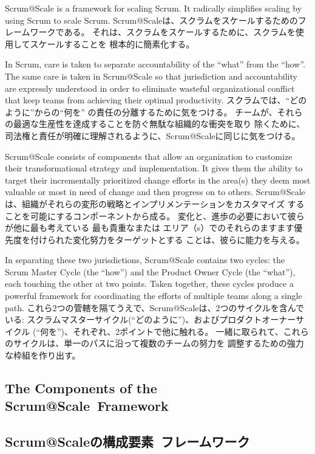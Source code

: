 \documentclass[12pt,a4paper,parskip=full]{scrartcl}
\begin{document}
Scrum@Scale is a framework for scaling Scrum. It radically simplifies
scaling by using Scrum to scale Scrum. 
\fi
Scrum@Scaleは、スクラムをスケールするためのフレームワークである。
それは、スクラムをスケールするために、スクラムを使用してスケールすることを
根本的に簡素化する。

In Scrum, care is taken to separate accountability of the ``what'' from the
``how''. The same care is taken in Scrum@Scale so that jurisdiction and
accountability are expressly understood in order to eliminate wasteful
organizational conflict that keep teams from achieving their optimal
productivity.
\fi
スクラムでは、``どのように''からの``何を'' の責任の分離するために気をつける。
チームが、それらの最適な生産性を達成することを防ぐ無駄な組織的な衝突を取り
除くために、司法権と責任が明確に理解されるように、Scrum@Scaleに同じに気をつける。

Scrum@Scale consists of components that allow an organization to
customize their transformational strategy and implementation. It gives them
the ability to target their incrementally prioritized change efforts in the area(s) they deem
most valuable or most in need of change and then progress on to others.
\fi
Scrum@Scaleは、組織がそれらの変形の戦略とインプリメンテーションをカスタマイズ
することを可能にするコンポーネントから成る。
変化と、進歩の必要において彼らが他に最も考えている 最も貴重なまたは
エリア（s）でのそれらのますます優先度を付けられた変化努力をターゲットとする
ことは、彼らに能力を与える。

In separating these two jurisdictions, Scrum@Scale contains two cycles: the
Scrum Master Cycle (the ``how'') and the Product Owner Cycle (the
``what''), each touching the other at two points. Taken together, these
cycles produce a powerful framework for coordinating the efforts of
multiple teams along a single path.
\fi
これら2つの管轄を隔てうえで、Scrum@Scaleは、2つのサイクルを含んでいる:
スクラムマスターサイクル(``どのように'')、およびプロダクトオーナーサイクル
(``何を'')、それぞれ、2ポイントで他に触れる。
一緒に取られて、これらのサイクルは、単一のパスに沿って複数のチームの努力を
調整するための強力な枠組を作り出す。

\subsection{The Components of the Scrum@Scale\textregistered ~Framework}
\fi
\subsection{Scrum@Scaleの構成要素\textregistered ~フレームワーク}
\end{document}
